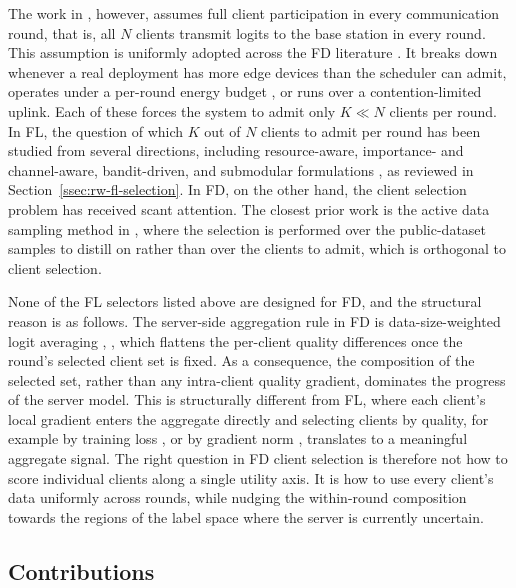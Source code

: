 \documentclass[journal]{IEEEtran}
\newcommand{\new}[1]{#1}
\newcommand{\rev}[1]{#1}
\begin{document}
The work in \cite{mu2024fedtskd}, however, assumes full client participation in every communication round, that is, all $N$ clients transmit logits to the base station in every round. This assumption is uniformly adopted across the FD literature \cite{itahara2023distillation, sattler2022cfd, sattler2023fedaux, wu2024fedict}. It breaks down whenever a real deployment has more edge devices than the scheduler can admit, operates under a per-round energy budget \rev{\cite{thakur2026grace}}, or runs over a contention-limited uplink. Each of these forces the system to admit only $K \ll N$ clients per round. \new{In FL, the question of which $K$ out of $N$ clients to admit per round has been studied from several directions, including resource-aware, importance- and channel-aware, bandit-driven, and submodular formulations \cite{nishio2019client, yang2020scheduling, ren2020scheduling, shi2020joint, xia2020mab, cho2020bandit, balakrishnan2022divfl}, as reviewed in Section~\ref{ssec:rw-fl-selection}.} In FD, on the other hand, the client selection problem has received scant attention. The closest prior work is the active data sampling method in \cite{liu2022active}, where the selection is performed over the public-dataset samples to distill on rather than over the clients to admit, which is orthogonal to client selection.

None of the FL selectors listed above are designed for FD, and the structural reason is as follows. The server-side aggregation rule in FD is data-size-weighted logit averaging \cite{mu2024fedtskd}, \cite{itahara2023distillation}, which flattens the per-client quality differences once the round's selected client set is fixed. As a consequence, the composition of the selected set, rather than any intra-client quality gradient, dominates the progress of the server model. This is structurally different from FL, where each client's local gradient enters the aggregate directly and selecting clients by quality, for example by training loss \cite{cho2020bandit}, \cite{xia2020mab} or by gradient norm \cite{wang2019adaptive}, translates to a meaningful aggregate signal. The right question in FD client selection is therefore not how to score individual clients along a single utility axis. It is how to use every client's data uniformly across rounds, while nudging the within-round composition towards the regions of the label space where the server is currently uncertain.

\subsection{Contributions}
\label{ssec:contributions}
\end{document}
